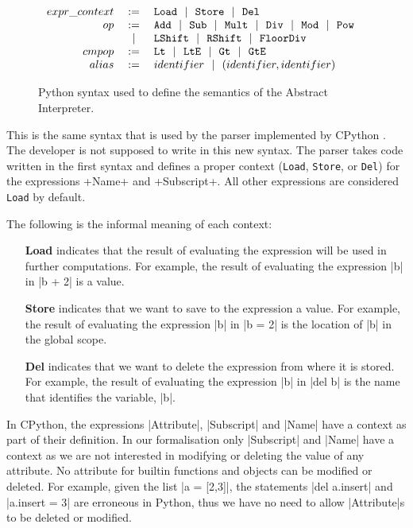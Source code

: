 \begin{figure}
\[\begin{array}{rclr}
  expr\_context &:=& \texttt{Load} ~~|~~ \texttt{Store} ~~|~~ \texttt{Del}  & \\

  op &:=& \texttt{Add} ~~|~~ \texttt{Sub} ~~|~~ \texttt{Mult} ~~|~~ \texttt{Div} ~~|~~
         \texttt{Mod} ~~|~~ \texttt{Pow} \\
     &~~|~~& \texttt{LShift} ~~|~~ \texttt{RShift} ~~|~~ \texttt{FloorDiv}  & \\
  cmpop &:=& \texttt{Lt} ~~|~~ \texttt{LtE} ~~|~~ \texttt{Gt} ~~|~~ \texttt{GtE}  & \\

  alias &:=& identifier ~~|~~ (identifier, identifier) & \\

\end{array}\]
\caption{Python syntax used to define the semantics of the Abstract Interpreter.\label{syntaxPython2}}
\end{figure}

This is the same syntax that is used by the parser implemented by CPython
\autocite{van2007python}. The developer is not supposed to write in this new syntax. The
parser takes code written in the first syntax and defines a proper context (\verb|Load|,
\verb|Store|, or \verb|Del|) for the expressions \pycode+Name+ and \pycode+Subscript+. All
other expressions are considered \verb|Load| by default.

The following is the informal meaning of each context:

\begin{itemize}
\tightlist
\item[\textbf{Load}] indicates that the result of evaluating the expression will be used
  in further computations. For example, the result of evaluating the expression \pycode|b|
  in \pycode|b + 2| is a value.
\item[\textbf{Store}] indicates that we want to save to the expression a value. For
  example, the result of evaluating the expression \pycode|b| in \pycode|b = 2| is the
  location of \pycode|b| in the global scope.
\item[\textbf{Del}] indicates that we want to delete the expression from where it is stored.
  For example, the result of evaluating the expression \pycode|b| in \pycode|del b| is the
  name that identifies the variable, \pycode|b|.
\end{itemize}

In CPython, the expressions \pycode|Attribute|, \pycode|Subscript| and \pycode|Name| have a
context as part of their definition. In our formalisation only \pycode|Subscript| and
\pycode|Name| have a context as we are not interested in modifying or deleting the value
of any attribute. No attribute for builtin functions and objects can be modified or
deleted. For example, given the list \pycode|a = [2,3]|, the statements
\pycode|del a.insert| and \pycode|a.insert = 3| are erroneous in Python, thus we have no
need to allow \pycode|Attribute|s to be deleted or modified.

